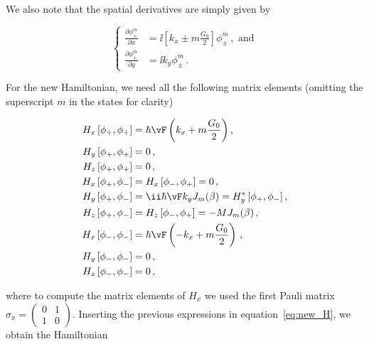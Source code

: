 \noindent We also note that the spatial derivatives are simply given by

\begin{equation}
        \begin{cases}
        \frac{\partial\phi_{\pm}^{m}}{\partial x} & = \ii \left[k_{x} \pm m \frac{G_{0}}{2}\right]\phi_{\pm}^{m}\,, \text{ and} \\
        \frac{\partial\phi_{\pm}^{m}}{\partial y} & = \ii k_{y}\phi_{\pm}^{m}\,.
        \end{cases}
\end{equation}

\noindent For the new Hamiltonian, we need all the following matrix elements (omitting the superscript $m$ in the states for clarity)

\begin{equation}
\begin{aligned}
    H_{x}\left[\phi_{+},\phi_{+}\right] & =\hbar \vF \left(k_{x}+m\frac{G_{0}}{2}\right) ,\\
    H_{y}\left[\phi_{+},\phi_{+}\right] & =0 \,,\\
    H_{z}\left[\phi_{+},\phi_{+}\right] & =0 \,,\\
    H_{x}\left[\phi_{+},\phi_{-}\right] & = H_{x}\left[\phi_{-},\phi_{+}\right]=0 \,,\\
    H_{y}\left[\phi_{+},\phi_{-}\right] & = \ii \hbar \vF  k_{y}J_{m}(\beta)=H_{y}^{*}\left[\phi_{+},\phi_{-}\right] ,\\
    H_{z}\left[\phi_{+},\phi_{-}\right] & = H_{z}\left[\phi_{-},\phi_{+}\right]=-M J_{m}(\beta) \,,\\
    H_{x}\left[\phi_{-},\phi_{-}\right] & = \hbar \vF \left(-k_{x}+m\frac{G_{0}}{2}\right) \,,\\
    H_{y}\left[\phi_{-},\phi_{-}\right] & =0 \,,\\
    H_{z}\left[\phi_{-},\phi_{-}\right] & =0 \,,
\end{aligned}
\end{equation}

\noindent where to compute the matrix elements of $H_x$ we used the first Pauli matrix $\sigma_x=\left(\begin{array}{cc}
                  0 & 1 \\
                  1 & 0
                 \end{array}\right)$.
\noindent Inserting the previous expressions in equation~\eqref{eq:new_H}, we obtain the Hamiltonian

